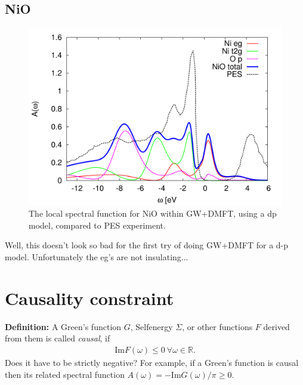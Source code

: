 \documentclass[12pt,a4paper]{scrartcl}
\numberwithin{equation}{section}
\newcommand{\cng}[1]{{\color{red}#1}}
\begin{document}
\clearpage


\subsection{NiO}
\begin{figure}[h]
\begin{center}
\includegraphics[width=1\textwidth]{figs/results/NiO_dos.pdf} 
\end{center}
\caption{The local spectral function for NiO within GW+DMFT,
using a dp model, compared to PES experiment.}
\label{fig:results_DOS_nio}
\end{figure}

Well, this doesn't look so bad for the first try of
doing GW+DMFT for a d-p model.
Unfortunately the eg's are not insulating...


\clearpage

\section{Causality constraint}

\textbf{Definition:}
A Green's function $G$, Selfenergy $\Sigma$, or other functions $F$ derived from them
is called \textit{causal}, if 
\begin{align}
\mathrm{Im}F(\omega) \leq 0 \  \forall \omega \in \mathbb{R}.
\end{align}
\cng{Does it have to be strictly negative? }
For example, if a Green's function is causal then its related
spectral function $A(\omega) = -\mathrm{Im}G(\omega)/\pi \geq 0$.
\end{document}

